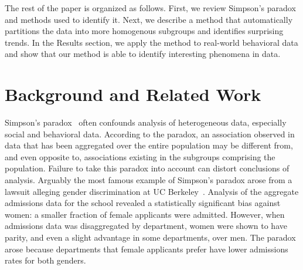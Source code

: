 \documentclass[letterpaper]{article} %
\begin{document}
The rest of the paper is organized as follows. First, we review Simpson's paradox and methods used to identify it. Next, we describe a method that automatically partitions the data into more homogenous subgroups and identifies surprising trends. In the Results section, we apply the method to real-world behavioral data and show that our method is able to identify interesting phenomena in data.


\section{Background and Related Work}
\label{sec:related}
Simpson's paradox~\cite{Blyth1972,Norton2015simpson} often confounds analysis of heterogeneous data, especially social and behavioral data. According to the paradox, an association observed in data that has been aggregated over the entire population may be different from, and even opposite to, associations existing in the subgroups comprising the population. Failure to take this paradox into account can distort conclusions of analysis. Arguably the most famous example of Simpson's paradox arose from a lawsuit alleging gender discrimination at UC Berkeley~\cite{Bickel1975}. Analysis of the aggregate admissions data for the school revealed a statistically significant bias against women: a smaller fraction of female applicants were admitted. However, when admissions data was disaggregated by department, women were shown to have parity, and even a slight advantage in some departments, over men. The paradox arose because departments that female applicants prefer have lower admissions rates for both genders.
\end{document}
